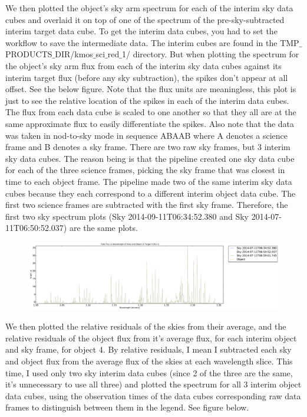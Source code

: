 \documentclass[10pt,letterpaper]{article}
\begin{document}
We then plotted the object's sky arm spectrum for each of the interim sky data cubes and overlaid it on top of one of the spectrum of the pre-sky-subtracted interim target data cube. To get the interim data cubes, you had to set the workflow to save the intermediate data. The interim cubes are found in the TMP$\_$PRODUCTS$\_$DIR/kmos$\_$sci$\_$red$\_$1/ directory. But when plotting the spectrum for the object's sky arm flux from each of the interim sky data cubes against its interim target flux (before any sky subtraction), the spikes don't appear at all offset. See the below figure. Note that the flux units are meaningless, this plot is just to see the relative location of the spikes in each of the interim data cubes. The flux from each data cube is scaled to one another so that they all are at the same approximate flux to easily differentiate the spikes. Also note that the data was taken in nod-to-sky mode in sequence ABAAB where A denotes a science frame and B denotes a sky frame. There are two raw sky frames, but 3 interim sky data cubes. The reason being is that the  
pipeline created one sky data cube for each of the three science  
frames, picking the sky frame that was closest in time to each object  
frame. The pipeline made two of the same interim sky data cubes because they each correspond to a different interim object data cube. The first two science frames are subtracted with the first sky frame. Therefore, the first two sky spectrum plots (Sky 2014-09-11T06:34:52.380 and Sky 2014-07-11T06:50:52.037) are the same plots.\\

\begin{figure}[h!]
\includegraphics[scale=0.4]{figures/flux_of_target_4_IFU_1_relative_residuals_from_interim_data.pdf}
\end{figure}

We then plotted the relative residuals of the skies from their average, and the relative residuals of the object flux from it's average flux, for each interim object and sky frame, for object 4. By relative residuals, I mean I subtracted each sky and object flux from the average flux of the skies at each wavelength slice. This time, I used only two sky interim data cubes (since 2 of the three are the same, it's unnecessary to use all three) and plotted the spectrum for all 3 interim object data cubes, using the observation times of the data cubes corresponding raw data frames to distinguish between them in the legend. See figure below.\\
\end{document}
